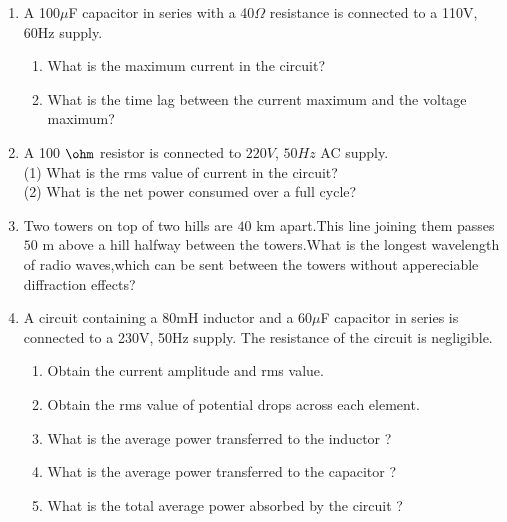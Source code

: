 \begin{enumerate}[label=\thesection.\arabic*,ref=\thesection.\theenumi]
\item A 100$\mu$F capacitor in series with a 40$\Omega$ resistance is connected to a 110V, 60Hz supply.
\begin{enumerate}[label = {\brak{\alph*}}]
\item What is the maximum current in the circuit?
\item What is the time lag between the current maximum and the voltage maximum?\\
\end{enumerate}
\solution
\pagebreak
\item A 100 $\ohm$ resistor is connected to $220 V$, $50 Hz$ AC supply.\\
(1) What is the rms value of current in the circuit?\\
(2) What is the net power consumed over a full cycle?

\solution
\pagebreak
\item  Two towers on top of two hills are $40$ km apart.This line joining them passes $50$ m above a hill halfway between the towers.What is the longest wavelength of radio waves,which can be sent between the towers without  appereciable diffraction effects?\\
\solution
\pagebreak
\item A circuit containing a 80mH inductor and a 60$\mu$F capacitor in series is connected to a 230V, 50Hz supply. The resistance of the circuit is negligible.\\
\begin{enumerate}
  \item Obtain the current amplitude and rms value.
  \item Obtain the rms value of potential drops across each element.
  \item What is the average power transferred to the inductor ?
  \item What is the average power transferred to the capacitor ?
  \item What is the total average power absorbed by the circuit ? 
\end{enumerate}
\solution
\pagebreak

\end{enumerate}
